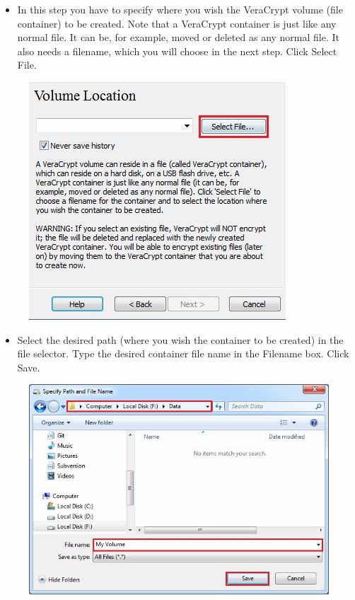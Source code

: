 \documentclass{tufte-handout}
\begin{document}
\begin{enumerate}
\begin{itemize}
		\item  In this step you have to specify where you wish the VeraCrypt volume (file container) to be created. Note that a VeraCrypt container is just like any normal file. It can be, for example, moved or deleted as any normal file. It also needs a filename, which you will choose in the next step.  Click Select File.
	\end{itemize}
	\begin{figure}%
		\includegraphics[width=\linewidth]{img/vc_install_4.png}
	\end{figure}
	\FloatBarrier
	\begin{itemize}
		\item  Select the desired path (where you wish the container to be created) in the file selector. Type the desired container file name in the Filename box.
	Click Save.
	\end{itemize}
	\begin{figure}%
		\includegraphics[width=\linewidth]{img/vc_install_5.png}

\end{figure}
\end{enumerate}
\end{document}
